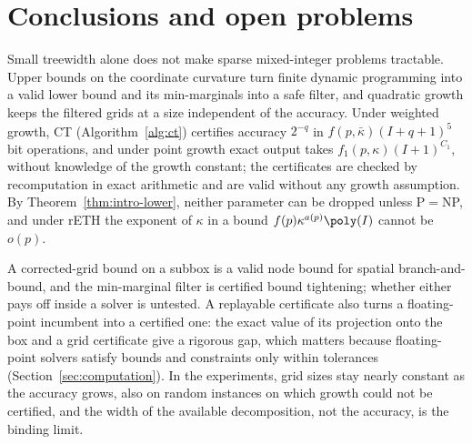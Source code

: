 \section{Conclusions and open problems}\label{sec:conclusion}

Small treewidth alone does not make sparse mixed-integer problems
tractable. Upper bounds on the coordinate curvature turn finite dynamic
programming into a valid lower bound and its min-marginals into a safe
filter, and quadratic growth keeps the filtered grids at a size independent
of the accuracy. Under weighted growth, CT (Algorithm~\ref{alg:ct})
certifies accuracy $2^{-q}$ in $f(p,\bar\kappa)(I+q+1)^5$ bit operations, and
under point growth exact output takes $f_1(p,\kappa)(I+1)^{C_1}$, without
knowledge of the growth constant; the certificates are checked by
recomputation in exact arithmetic and are valid without any growth
assumption. By Theorem~\ref{thm:intro-lower}, neither parameter can be
dropped unless P${}={}$NP, and under rETH the exponent of $\kappa$ in a bound
$f(p)\kappa^{a(p)}\poly(I)$ cannot be $o(p)$.

A corrected-grid bound on a subbox is a valid node bound for spatial
branch-and-bound, and the min-marginal filter is certified bound tightening;
whether either pays off inside a solver is untested. A replayable certificate
also turns a floating-point incumbent into a certified one: the exact value of
its projection onto the box and a grid certificate give a rigorous gap, which
matters because floating-point solvers satisfy bounds and constraints only
within tolerances (Section~\ref{sec:computation}). In the experiments, grid
sizes stay nearly constant as the accuracy grows, also on random instances
on which growth could not be certified, and the width of the available
decomposition, not the accuracy, is the binding limit.

